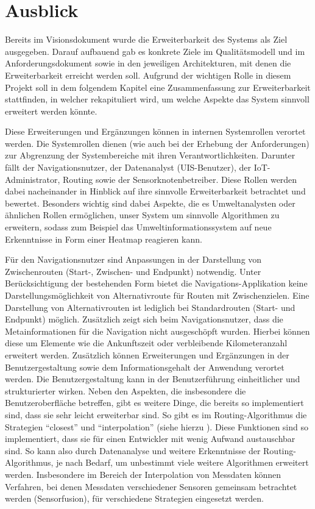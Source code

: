 \chapter{Ausblick}
Bereits im Visionsdokument wurde die Erweiterbarkeit des Systems als Ziel ausgegeben. 
Darauf aufbauend gab es konkrete Ziele im Qualitätsmodell und im Anforderungsdokument sowie in den jeweiligen Architekturen, mit denen die Erweiterbarkeit erreicht werden soll.
Aufgrund der wichtigen Rolle in diesem Projekt soll in dem folgendem Kapitel eine Zusammenfassung zur Erweiterbarkeit stattfinden, in welcher rekapituliert wird, um welche Aspekte das System sinnvoll erweitert werden könnte.


Diese Erweiterungen und Ergänzungen können in internen Systemrollen verortet werden.   
Die Systemrollen dienen (wie auch bei der Erhebung der Anforderungen) zur Abgrenzung der Systembereiche mit ihren Verantwortlichkeiten. Darunter fällt der Navigationsnutzer, der Datenanalyst (UIS-Benutzer), der IoT-Administrator,   Routing sowie der Sensorknotenbetreiber.
Diese Rollen werden dabei nacheinander in Hinblick auf ihre sinnvolle Erweiterbarkeit betrachtet und bewertet. 
Besonders wichtig sind dabei Aspekte, die es Umweltanalysten oder ähnlichen Rollen ermöglichen, unser System um sinnvolle Algorithmen zu erweitern, sodass zum Beispiel das Umweltinformationssystem auf neue Erkenntnisse in Form einer Heatmap reagieren kann.


Für den Navigationsnutzer sind Anpassungen in der Darstellung von Zwischenrouten (Start-, Zwischen- und Endpunkt) notwendig. 
Unter Berücksichtigung der bestehenden Form bietet die Navigations-Applikation keine Darstellungsmöglichkeit von Alternativroute für Routen mit Zwischenzielen. 
Eine Darstellung von Alternativrouten ist lediglich bei Standardrouten (Start- und Endpunkt) möglich. 
Zusätzlich zeigt sich beim Navigationsnutzer, dass die Metainformationen für die Navigation nicht ausgeschöpft wurden. 
Hierbei können diese um Elemente wie die Ankunftszeit oder verbleibende Kilometeranzahl erweitert werden. 
Zusätzlich können Erweiterungen und Ergänzungen in der Benutzergestaltung sowie dem Informationsgehalt der Anwendung verortet werden. 
Die Benutzergestaltung kann in der Benutzerführung einheitlicher und strukturierter wirken. 
Neben den Aspekten, die insbesondere die Benutzeroberfläche betreffen, gibt es weitere Dinge, die bereits so implementiert sind, dass sie sehr leicht erweiterbar sind. 
So gibt es im Routing-Algorithmus die Strategien "`closest"' und "`interpolation"' (siehe hierzu ).
Diese Funktionen sind so implementiert, dass sie für einen Entwickler mit wenig Aufwand austauschbar sind. 
So kann also durch Datenanalyse und weitere Erkenntnisse der Routing-Algorithmus, je nach Bedarf, um unbestimmt viele weitere Algorithmen erweitert werden. Insbesondere im Bereich der Interpolation von Messdaten können Verfahren, bei denen Messdaten verschiedener Sensoren gemeinsam betrachtet werden (Sensorfusion), für verschiedene Strategien eingesetzt werden.    


